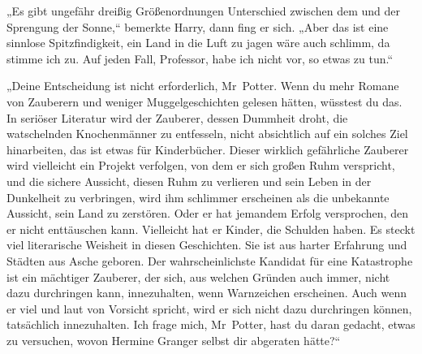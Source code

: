„Es gibt ungefähr dreißig Größenordnungen Unterschied zwischen dem und der Sprengung der Sonne,“ bemerkte Harry, dann fing er sich. „Aber das ist eine sinnlose Spitzfindigkeit, ein Land in die Luft zu jagen wäre auch schlimm, da stimme ich zu. Auf jeden Fall, Professor, habe ich nicht vor, so etwas zu tun.“

„Deine Entscheidung ist nicht erforderlich, Mr~Potter. Wenn du mehr Romane von Zauberern und weniger Muggelgeschichten gelesen hätten, wüsstest du das. In seriöser Literatur wird der Zauberer, dessen Dummheit droht, die watschelnden Knochenmänner zu entfesseln, nicht absichtlich auf ein solches Ziel hinarbeiten, das ist etwas für Kinderbücher. Dieser wirklich gefährliche Zauberer wird vielleicht ein Projekt verfolgen, von dem er sich großen Ruhm verspricht, und die sichere Aussicht, diesen Ruhm zu verlieren und sein Leben in der Dunkelheit zu verbringen, wird ihm schlimmer erscheinen als die unbekannte Aussicht, sein Land zu zerstören. Oder er hat jemandem Erfolg versprochen, den er nicht enttäuschen kann. Vielleicht hat er Kinder, die Schulden haben. Es steckt viel literarische Weisheit in diesen Geschichten. Sie ist aus harter Erfahrung und Städten aus Asche geboren. Der wahrscheinlichste Kandidat für eine Katastrophe ist ein mächtiger Zauberer, der sich, aus welchen Gründen auch immer, nicht dazu durchringen kann, innezuhalten, wenn Warnzeichen erscheinen. Auch wenn er viel und laut von Vorsicht spricht, wird er sich nicht dazu durchringen können, tatsächlich innezuhalten. Ich frage mich, Mr~Potter, hast du daran gedacht, etwas zu versuchen, wovon Hermine Granger selbst dir abgeraten hätte?“

